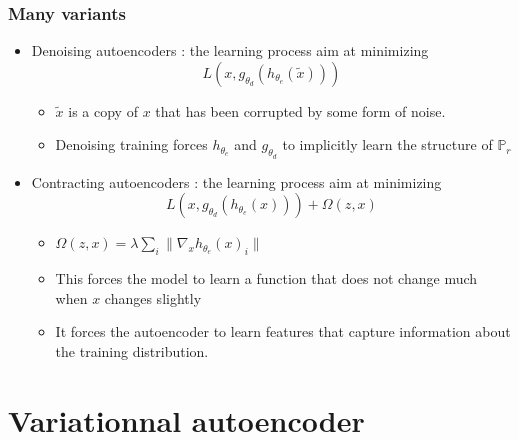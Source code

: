 \documentclass[french,9pt]{beamer}
\begin{document}
\begin{frame}
\frametitle{Many variants}

\begin{itemize}
\item Denoising autoencoders : the learning process aim at minimizing $$L(x,g_{\theta_{d}}(h_{\theta_{e}}(\tilde{x})))$$
\begin{itemize}
\item $\tilde{x}$ is a copy of $x$ that has been corrupted by some form of noise.
\item Denoising training forces $h_{\theta_{e}}$ and $g_{\theta_{d}}$ to implicitly learn the structure of $\mathbb{P}_{r}$
\end{itemize}
\item Contracting autoencoders : the learning process aim at minimizing $$L(x,g_{\theta_{d}}(h_{\theta_{e}}(x))) + \Omega(z,x)$$
\begin{itemize}
\item $\Omega(z,x) = \lambda \sum_{i} \| \nabla_{x} h_{\theta_{e}}(x)_{i} \|$
\item This forces the model to learn a function that does not change much when $x$ changes slightly
\item It forces the autoencoder to learn features that capture information about the training distribution.
\end{itemize}
\end{itemize}


\end{frame}





\section{Variationnal autoencoder}

\end{document}
